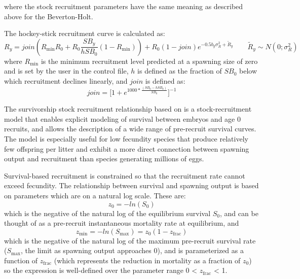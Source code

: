where the stock recruitment parameters have the same meaning as described above for the Beverton-Holt.

\hypertarget{Hockey}{}
The hockey-stick recruitment curve is calculated as:
\begin{equation}{R_y = join(R_{\text{min}}R_0+R_0\frac{SB_y}{hSB_0}(1-R_{\text{min}}))+R_0(1-join)e^{-0.5b_y\sigma^2_R+\tilde{R}_y}\qquad  \tilde{R}_y\sim N(0;\sigma^2_R)}\end{equation}
where $R_{\text{min}}$ is the minimum recruitment level predicted at a spawning size of zero and is set by the user in the control file, $h$ is defined as the fraction of $SB_0$ below which recruitment declines linearly, and $join$ is defined as:
\begin{equation}{ join = \bigg[1+e^{1000*\frac{(SB_0-hSB_0)}{SB_0}}\bigg]^{-1} } \end{equation}

\hypertarget{Survivorship}{}
The survivorship stock recruitment relationship based on \citet{taylor-stockrecruitment-2013} is a stock-recruitment model that enables explicit modeling of survival between embryos and age 0 recruits, and allows the description of a wide range of pre-recruit survival curves. The model is especially useful for low fecundity species that produce relatively few offspring per litter and exhibit a more direct connection between spawning output and recruitment than species generating millions of eggs.

Survival-based recruitment is constrained so that the recruitment rate cannot exceed fecundity. The relationship between survival and spawning output is based on parameters which are on a natural log scale. These are:
\begin{equation}
z_0=-ln(S_0)
\end{equation} 
which is the negative of the natural log of the equilibrium survival $S_0$, and can be thought of as a pre-recruit instantaneous mortality rate at equilibrium, and
\begin{equation}
z_{\text{min}}=-ln(S_{\text{max}})=z_0(1-z_{\text{frac}})
\end{equation}
which is the negative of the natural log of the maximum pre-recruit survival rate ($S_{\text{max}}$, the limit as spawning output approaches 0), and is parameterized as a function of $z_{\text{frac}}$ (which represents the reduction in mortality as a fraction of $z_0$) so the expression is well-defined over the parameter range 0 < $z_{\text{frac}}$ < 1.

